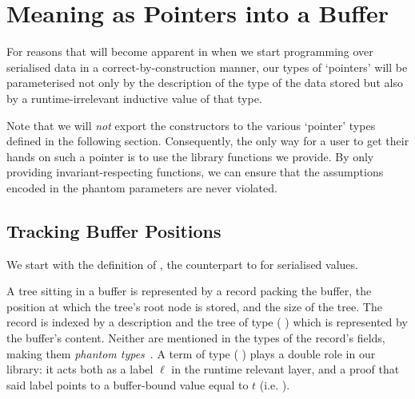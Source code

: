 \section{Meaning as Pointers into a Buffer}\label{sec:pointers}

For reasons that will become apparent in 
when we start programming over serialised data in a correct-by-construction
manner, our types of `pointers' will be parameterised not only
by the description of the type of the data stored but also by a
runtime-irrelevant inductive value of that type.

Note that we will \emph{not} export the constructors to the various
`pointer' types defined in the following section.
%
Consequently, the only way for a user to get their hands on such a
pointer is to use the library functions we provide.
%
By only providing invariant-respecting functions, we can ensure
that the assumptions encoded in the phantom parameters are never
violated.

\subsection{Tracking Buffer Positions}

We start with the definition of ,
the counterpart to  for serialised values.


A tree sitting in a buffer is represented
by a record packing the buffer, the position at which the tree's
root node is stored, and the size of the tree.
%
The record is indexed by  a  description
and  the tree of type ( )
which is represented by the buffer's content.
Neither are mentioned in the types of the record's fields, making them
\emph{phantom types}~\citep{DBLP:conf/dsl/LeijenM99}.
%
A term of type (  )
plays a double role in our library: it acts both as a label $\ell$ in
the runtime relevant layer, and a proof that said label points to a
buffer-bound value equal to $t$
(i.e. ).



